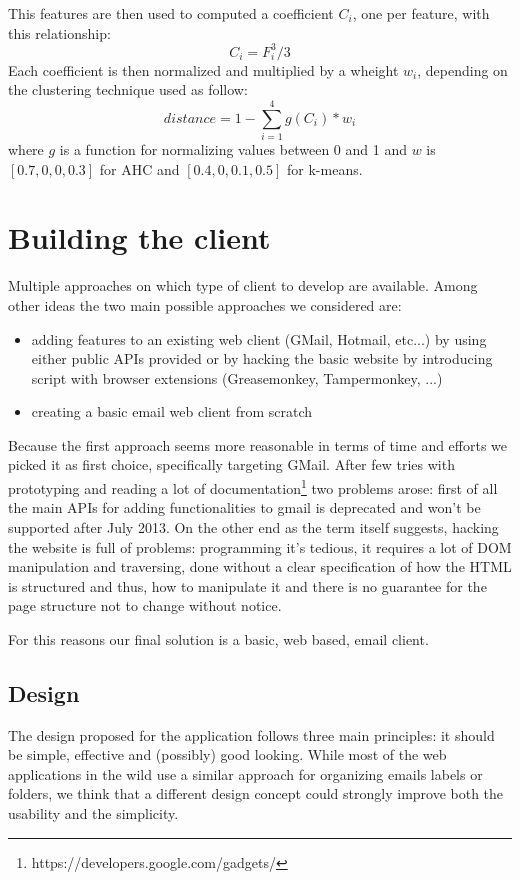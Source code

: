 \documentclass[a4paper,12pt]{report}
\begin{document}
This features are then used to computed a coefficient $C_{i}$, one per feature, with this relationship:
\[C_{i} = F_{i}^3 / 3 \]
Each coefficient is then normalized and multiplied by a wheight $w_{i}$, depending on the clustering technique used as follow:
\[distance = 1 - \sum_{i=1}^{4} g(C_i)*w_i \]
where $g$ is a function for normalizing values between 0 and 1 and $w$ is $[0.7, 0, 0, 0.3]$ for AHC and $[0.4, 0, 0.1, 0.5]$ for k-means.
\chapter{Building the client}
Multiple approaches on which type of client to develop are available. Among other ideas the two main possible approaches we considered are:
\begin{itemize}
\item adding features to an existing web client (GMail, Hotmail, etc...) by using either public APIs provided or by hacking the basic website by introducing script with browser extensions (Greasemonkey, Tampermonkey, ...)
\item creating a basic email web client from scratch
\end{itemize}

Because the first approach seems more reasonable in terms of time and efforts we picked it as first choice, specifically targeting GMail. After few tries with prototyping and reading a lot of documentation\footnote{https://developers.google.com/gadgets/} two problems arose: first of all the main APIs for adding functionalities to gmail is deprecated and won't be supported after July 2013. On the other end as the term itself suggests, hacking the website is full of problems: programming it's tedious, it requires a lot of DOM manipulation and traversing, done without a clear specification of how the HTML is structured and thus, how to manipulate it and there is no guarantee for the page structure not to change without notice.

For this reasons our final solution is a basic, web based, email client.
\section{Design}

The design proposed for the application follows three main principles: it should be simple, effective and (possibly) good looking.
While most of the web applications in the wild use a similar approach for organizing emails labels or folders, we think that a different design concept could strongly improve both the usability and the simplicity.
\end{document}
